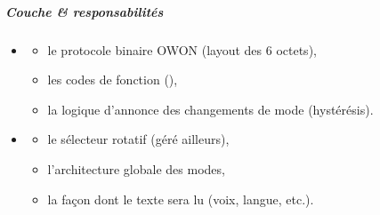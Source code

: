 \documentclass[letterpaper,10pt,french]{sphinxmanual}
\begin{document}
\subparagraph{Couche \& responsabilités}
\label{\detokenize{api/hardware.devices:couche-responsabilites}}\begin{itemize}
\item {} \begin{description}
\begin{itemize}
\item {} 
\sphinxAtStartPar
le protocole binaire OWON (layout des 6 octets),

\item {} 
\sphinxAtStartPar
les codes de fonction (),

\item {} 
\sphinxAtStartPar
la logique d’annonce des changements de mode (hystérésis).

\end{itemize}

\end{description}

\item {} \begin{description}
\begin{itemize}
\item {} 
\sphinxAtStartPar
le sélecteur rotatif (géré ailleurs),

\item {} 
\sphinxAtStartPar
l’architecture globale des modes,

\item {} 
\sphinxAtStartPar
la façon dont le texte sera lu (voix, langue, etc.).

\end{itemize}

\end{description}

\end{itemize}
\end{document}
